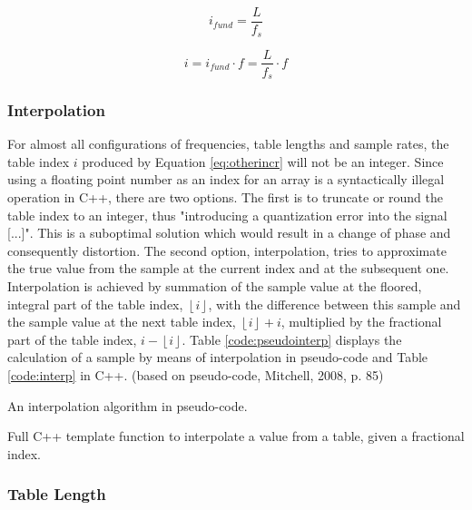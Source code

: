 \begin{equation}
  i_{fund} = \frac{L}{f_{s}}
  \label{eq:fundincr}
\end{equation}

\begin{equation}
  i = i_{fund} \cdot f = \frac{L}{f_{s}} \cdot f
  \label{eq:otherincr}
\end{equation}

\subsubsection{Interpolation}

For almost all configurations of frequencies, table lengths and sample rates, the table index $i$ produced by Equation \ref{eq:otherincr} will not be an integer. Since using a floating point number as an index for an array is a syntactically illegal operation in C++, there are two options. The first is to truncate or round the table index to an integer, thus "introducing a quantization error into the signal [...]".  This is a suboptimal solution which would result in a change of phase and consequently distortion.  The second option, interpolation, tries to approximate the true value from the sample at the current index and at the subsequent one. Interpolation is achieved by summation of the sample value at the floored, integral part of the table index, $\left \lfloor{i}\right \rfloor$, with the difference between this sample and the sample value at the next table index, $\left \lfloor {i}\right \rfloor + i$, multiplied by the fractional part of the table index, $i - \left \lfloor {i}\right \rfloor$. Table \ref{code:pseudointerp} displays the calculation of a sample by means of interpolation in pseudo-code and Table \ref{code:interp} in C++. (based on pseudo-code, Mitchell, 2008, p. 85)

\begin{table}
  \caption{An interpolation algorithm in pseudo-code.}
  \label{code:pseudointerp}
\end{table}

\begin{table}
  \caption{Full C++ template function to interpolate a value from a table, given a fractional index. }
  \label{code:interp}
\end{table}

\subsubsection{Table Length}

